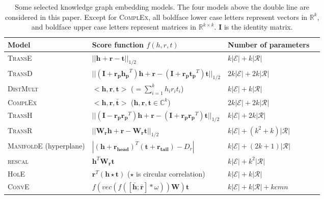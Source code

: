 \documentclass[11pt,a4paper]{article}
\begin{document}
\begin{table*}[t]
\centering
\small
\begin{tabular}{|l|l|l|l|}
\hline
\textbf{Model} & \textbf{Score function $f(h, r, t)$} & \textbf{Number of parameters} \\ \hline
\textsc{TransE} & $||\mathbf{h}+\mathbf{r}-\mathbf{t}||_{1/2}$ & $k|\mathcal{E}|+k|\mathcal{R}|$ \\ \hline
\textsc{TransD} & $||(\mathbf{I}+\mathbf{r_p}\mathbf{h_p}^T)\mathbf{h}+\mathbf{r}-(\mathbf{I}+\mathbf{r_p}\mathbf{t_p}^T)\mathbf{t}||_{1/2}$ & $2k|\mathcal{E}|+2k|\mathcal{R}|$ \\ \hline
\textsc{DistMult} & $<\mathbf{h}, \mathbf{r}, \mathbf{t}>$ ($=\sum_{i=1}^{k} h_i r_i t_i$) & $k|\mathcal{E}|+k|\mathcal{R}|$ \\ \hline
\textsc{ComplEx} & $<\mathbf{h}, \mathbf{r}, \mathbf{\bar{t}}>$ ($\mathbf{h}, \mathbf{r}, \mathbf{t} \in \mathbb{C}^k$) & $2k|\mathcal{E}|+2k|\mathcal{R}|$ \\ \hline\hline
\textsc{TransH} & $||(\mathbf{I}-\mathbf{r_p}\mathbf{r_p}^T)\mathbf{h}+\mathbf{r}-(\mathbf{I}+\mathbf{r_p}\mathbf{r_p}^T)\mathbf{t}||_{1/2}$ & $k|\mathcal{E}|+2k|\mathcal{R}|$ \\ \hline
\textsc{TransR} & $||\mathbf{W_r}\mathbf{h}+\mathbf{r}-\mathbf{W_r}\mathbf{t}||_{1/2}$ & $k|\mathcal{E}|+(k^2+k)|\mathcal{R}|$ \\ \hline
\textsc{ManifoldE} (hyperplane) & $|(\mathbf{h}+\mathbf{r_{head}})^T(\mathbf{t}+\mathbf{r_{tail}})-D_r|$ & $k|\mathcal{E}|+(2k+1)|\mathcal{R}|$ \\ \hline
\textsc{rescal} & $\mathbf{h}^T\mathbf{W_r}\mathbf{t}$ & $k|\mathcal{E}|+k^2|\mathcal{R}|$ \\ \hline
\textsc{HolE} & $\mathbf{r}^T(\mathbf{h}\star\mathbf{t})$ ($\star$ is circular correlation) & $k|\mathcal{E}|+k|\mathcal{R}|$ \\ \hline
\textsc{ConvE} & $f(vec(f([\bar{\mathbf{h}};\bar{\mathbf{r}}]*\omega))\mathbf{W})\mathbf{t}$ & $k|\mathcal{E}|+k|\mathcal{R}|+kcmn$ \\ \hline
\end{tabular}
\caption{Some selected knowledge graph embedding models. The four models above the double line are considered in this
paper. Except for \textsc{ComplEx}, all boldface lower case letters represent vectors in $\mathbb{R}^k$, and boldface upper case letters represent matrices in $\mathbb{R}^{k\times k}$. $\mathbf{I}$ is the identity matrix.}
\label{tab:models}
\end{table*}
\end{document}
